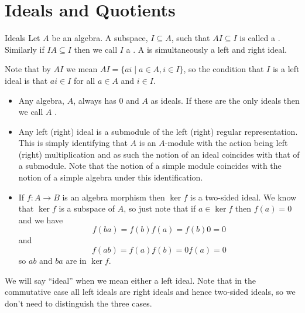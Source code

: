 \documentclass[fleqn]{NotesClass}
\begin{document}
    \section{Ideals and Quotients}
    \begin{dfn}{Ideals}{}
        Let \(A\) be an algebra.
        A subspace, \(I \subseteq A\), such that \(AI \subseteq I\) is called a .
        Similarly if \(IA \subseteq I\) then we call \(I\) a .
        A  is simultaneously a left and right ideal.
    \end{dfn}
    
    Note that by \(AI\) we mean \(AI = \{a i \mid a \in A, i \in I\}\), so the condition that \(I\) is a left ideal is that \(ai \in I\) for all \(a \in A\) and \(i \in I\).
    
    \begin{exm}{}{}
        \begin{itemize}
            \item Any algebra, \(A\), always has \(0\) and \(A\) as ideals.
            If these are the only ideals then we call \(A\) .
            \item Any left (right) ideal is a submodule of the left (right) regular representation.
            This is simply identifying that \(A\) is an \(A\)-module with the action being left (right) multiplication and as such the notion of an ideal coincides with that of a submodule.
            Note that the notion of a simple module coincides with the notion of a simple algebra under this identification.
            \item If \(f \colon A \to B\) is an algebra morphism then \(\ker f\) is a two-sided ideal.
            We know that \(\ker f\) is a subspace of \(A\), so just note that if \(a \in \ker f\) then \(f(a) = 0\) and we have
            \begin{equation}
                f(ba) = f(b)f(a) = f(b)0 = 0
            \end{equation}
            and
            \begin{equation}
                f(ab) = f(a)f(b) = 0f(a) = 0
            \end{equation}
            so \(ab\) and \(ba\) are in \(\ker f\).
        \end{itemize}
    \end{exm}
    
    We will say \enquote{ideal} when we mean either a left ideal.
    Note that in the commutative case all left ideals are right ideals and hence two-sided ideals, so we don't need to distinguish the three cases.
    
\end{document}
